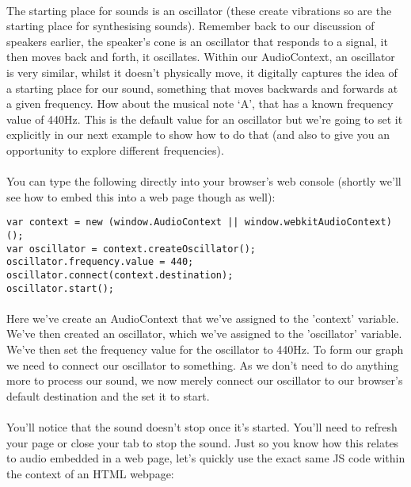 \paragraph{} The starting place for sounds is an oscillator (these create vibrations so are the starting place for synthesising sounds). Remember back to our discussion of speakers earlier, the speaker's cone is an oscillator that responds to a signal, it then moves back and forth, it oscillates. Within our AudioContext, an oscillator is very similar, whilst it doesn't physically move, it digitally captures the idea of a starting place for our sound, something that moves backwards and forwards at a given frequency. How about the musical note ‘A’, that has a known frequency value of 440Hz. This is the default value for an oscillator but we're going to set it explicitly in our next example to show how to do that (and also to give you an opportunity to explore different frequencies).
\paragraph{} You can type the following directly into your browser's web console (shortly we'll see how to embed this into a web page though as well):

\begin{lstlisting}
var context = new (window.AudioContext || window.webkitAudioContext)();
var oscillator = context.createOscillator();
oscillator.frequency.value = 440;
oscillator.connect(context.destination);
oscillator.start();
\end{lstlisting}

\paragraph{} Here we've create an AudioContext that we've assigned to the 'context' variable. We've then created an oscillator, which we've assigned to the 'oscillator' variable. We've then set the frequency value for the oscillator to 440Hz. To form our graph we need to connect our oscillator to something. As we don't need to do anything more to process our sound, we now merely connect our oscillator to our browser's default destination and the set it to start.

\paragraph{} You'll notice that the sound doesn't stop once it's started. You'll need to refresh your page or close your tab to stop the sound. Just so you know how this relates to audio embedded in a web page, let's quickly use the exact same JS code within the context of an HTML webpage:

